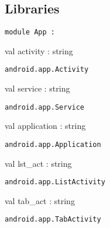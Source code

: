 \documentclass[11pt]{article}
\begin{document}
\ocamldocvspace{0.5cm}



\subsection{Libraries}




\begin{ocamldoccode}
{\tt{module }}{\tt{App}}{\tt{ : }}\end{ocamldoccode}
\label{module:Android.App}

\begin{ocamldocsigend}


\label{val:Android.App.activity}\begin{ocamldoccode}
val activity : string
\end{ocamldoccode}
\begin{ocamldocdescription}
{\tt{android.app.Activity}}


\end{ocamldocdescription}


\label{val:Android.App.service}\begin{ocamldoccode}
val service : string
\end{ocamldoccode}
\begin{ocamldocdescription}
{\tt{android.app.Service}}


\end{ocamldocdescription}


\label{val:Android.App.application}\begin{ocamldoccode}
val application : string
\end{ocamldoccode}
\begin{ocamldocdescription}
{\tt{android.app.Application}}


\end{ocamldocdescription}


\label{val:Android.App.lst-underscoreact}\begin{ocamldoccode}
val lst_act : string
\end{ocamldoccode}
\begin{ocamldocdescription}
{\tt{android.app.ListActivity}}


\end{ocamldocdescription}


\label{val:Android.App.tab-underscoreact}\begin{ocamldoccode}
val tab_act : string
\end{ocamldoccode}
\begin{ocamldocdescription}
{\tt{android.app.TabActivity}}



\end{ocamldocdescription}
\end{ocamldocsigend}
\end{document}
